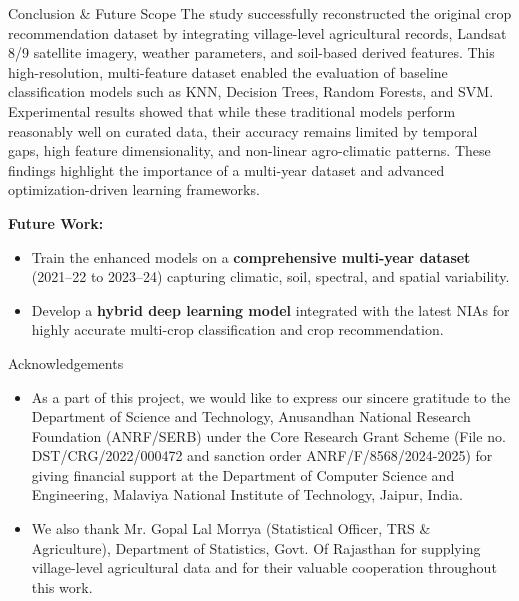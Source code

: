 \documentclass[aspectratio=169]{beamer}
\begin{document}
\begin{frame}{Conclusion \& Future Scope}
\small
The study successfully reconstructed the original crop recommendation dataset by integrating village-level agricultural records, Landsat 8/9 satellite imagery, weather parameters, and soil-based derived features. This high-resolution, multi-feature dataset enabled the evaluation of baseline classification models such as KNN, Decision Trees, Random Forests, and SVM. Experimental results showed that while these traditional models perform reasonably well on curated data, their accuracy remains limited by temporal gaps, high feature dimensionality, and non-linear agro-climatic patterns. These findings highlight the importance of a multi-year dataset and advanced optimization-driven learning frameworks.

\vspace{5mm}

\textbf{Future Work:}
\begin{itemize}
    \item Train the enhanced models on a \textbf{comprehensive multi-year dataset} (2021–22 to 2023–24) capturing climatic, soil, spectral, and spatial variability.
    \item Develop a \textbf{hybrid deep learning model} integrated with the latest NIAs for highly accurate multi-crop classification and crop recommendation.
\end{itemize}

\end{frame}

\begin{frame}{Acknowledgements}
    \begin{itemize}
        \item As a part of this project, we would like to express our sincere gratitude to the Department of Science and Technology, Anusandhan National Research Foundation (ANRF/SERB) under the Core Research Grant Scheme (File no. DST/CRG/2022/000472 and sanction order ANRF/F/8568/2024-2025) for giving financial support at the Department of Computer Science and Engineering, Malaviya National Institute of Technology, Jaipur, India. 
        \item We also thank Mr. Gopal Lal Morrya (Statistical Officer, TRS \& Agriculture), Department of Statistics, Govt. Of Rajasthan for supplying village-level agricultural data and for their valuable cooperation throughout this work.
    \end{itemize}
\end{frame}


\end{document}
